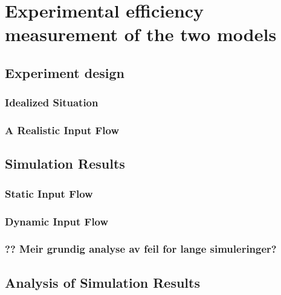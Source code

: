 \documentclass[b5paper,12 pt]{report}
\begin{document}

		
		



	
	\chapter{Experimental efficiency measurement of the two models}
	\label{chExperimentalEfficiencyMeasurement}
		\section{Experiment design} 	%
			\subsection{Idealized Situation}
			\subsection{A Realistic Input Flow}
		\section{Simulation Results} 	%
			\subsection{Static Input Flow}
			\subsection{Dynamic Input Flow}
			\subsection{?? Meir grundig analyse av feil for lange simuleringer?}
		\section{Analysis of Simulation Results} %
\end{document}
